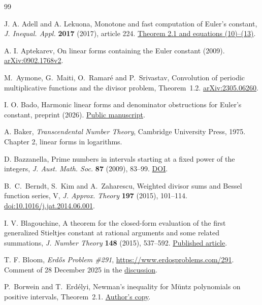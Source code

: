 \documentclass[11pt,a4paper,oneside,openany]{report}
\theoremstyle{remark}\newtheorem{remark}[theorem]{Remark}
\numberwithin{equation}{section}
\begin{document}
\clearpage{}
\begin{thebibliography}{99}

 J. A. Adell and A. Lekuona, Monotone and fast computation of Euler's constant, \emph{J. Inequal. Appl.} \textbf{2017} (2017), article 224. \href{https://doi.org/10.1186/s13660-017-1507-8}{Theorem 2.1 and equations (10)--(13)}.

 A. I. Aptekarev, On linear forms containing the Euler constant (2009). \href{https://arxiv.org/abs/0902.1768}{arXiv:0902.1768v2}.

 M.~Aymone, G.~Maiti, O.~Ramar\'e and P.~Srivastav, Convolution of periodic multiplicative functions and the divisor problem, Theorem~1.2. \href{https://arxiv.org/abs/2305.06260}{arXiv:2305.06260}.

 I. O. Bado, Harmonic linear forms and denominator obstructions for Euler's constant, preprint (2026). \href{https://www.researchgate.net/publication/405280961}{Public manuscript}.

 A. Baker, \emph{Transcendental Number Theory}, Cambridge University Press, 1975. Chapter 2, linear forms in logarithms.

 D. Bazzanella, Prime numbers in intervals starting at a fixed power of the integers, \emph{J. Aust. Math. Soc.} \textbf{87} (2009), 83--99. \href{https://doi.org/10.1017/S1446788709000020}{DOI}.

 B.~C.~Berndt, S.~Kim and A.~Zaharescu, Weighted divisor sums and Bessel function series, V, \emph{J. Approx. Theory} \textbf{197} (2015), 101--114. \href{https://doi.org/10.1016/j.jat.2014.06.001}{doi:10.1016/j.jat.2014.06.001}.

 I. V. Blagouchine, A theorem for the closed-form evaluation of the first generalized Stieltjes constant at rational arguments and some related summations, \emph{J. Number Theory} \textbf{148} (2015), 537--592. \href{https://doi.org/10.1016/j.jnt.2014.08.009}{Published article}.

 T. F. Bloom, \emph{Erd\H{o}s Problem \#291}, \url{https://www.erdosproblems.com/291}. Comment of 28 December 2025 in the \href{https://www.erdosproblems.com/forum/thread/291?embed=1}{discussion}.

 P.~Borwein and T.~Erd\'elyi, Newman's inequality for M\"untz polynomials on positive intervals, Theorem~2.1. \href{https://people.tamu.edu/~terdelyi/papers-online/positive.pdf}{Author's copy}.


\end{thebibliography}
\end{document}
